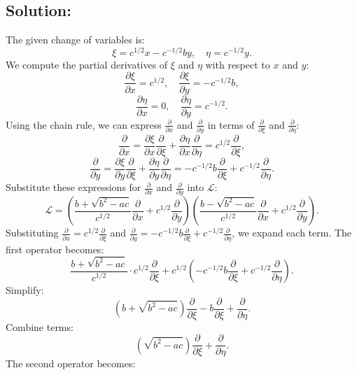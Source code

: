 \documentclass[12pt]{article}
\begin{document}
    \subsection*{Solution:}
        The given change of variables is:
        \[
        \xi = c^{1/2}x - c^{-1/2}by, \quad \eta = c^{-1/2}y.
        \]
        We compute the partial derivatives of \(\xi\) and \(\eta\) with respect to \(x\) and \(y\):
        \[
        \frac{\partial \xi}{\partial x} = c^{1/2}, \quad \frac{\partial \xi}{\partial y} = -c^{-1/2}b,
        \]
        \[
        \frac{\partial \eta}{\partial x} = 0, \quad \frac{\partial \eta}{\partial y} = c^{-1/2}.
        \]
        Using the chain rule, we can express \(\frac{\partial}{\partial x}\) and \(\frac{\partial}{\partial y}\) in terms of \(\frac{\partial}{\partial \xi}\) and \(\frac{\partial}{\partial \eta}\):
        \[
        \frac{\partial}{\partial x} = \frac{\partial \xi}{\partial x} \frac{\partial}{\partial \xi} + \frac{\partial \eta}{\partial x} \frac{\partial}{\partial \eta} = c^{1/2} \frac{\partial}{\partial \xi},
        \]
        \[
        \frac{\partial}{\partial y} = \frac{\partial \xi}{\partial y} \frac{\partial}{\partial \xi} + \frac{\partial \eta}{\partial y} \frac{\partial}{\partial \eta} = -c^{-1/2}b \frac{\partial}{\partial \xi} + c^{-1/2} \frac{\partial}{\partial \eta}.
        \]
        Substitute these expressions for \(\frac{\partial}{\partial x}\) and \(\frac{\partial}{\partial y}\) into \(\mathcal{L}\):
        \[
        \mathcal{L} = \left( \frac{b + \sqrt{b^2 - ac}}{c^{1/2}} \frac{\partial}{\partial x} + c^{1/2} \frac{\partial}{\partial y} \right) \left( \frac{b - \sqrt{b^2 - ac}}{c^{1/2}} \frac{\partial}{\partial x} + c^{1/2} \frac{\partial}{\partial y} \right).
        \]
        Substituting \(\frac{\partial}{\partial x} = c^{1/2} \frac{\partial}{\partial \xi}\) and \(\frac{\partial}{\partial y} = -c^{-1/2}b \frac{\partial}{\partial \xi} + c^{-1/2} \frac{\partial}{\partial \eta}\), we expand each term.
        The first operator becomes:
        \[
        \frac{b + \sqrt{b^2 - ac}}{c^{1/2}} \cdot c^{1/2} \frac{\partial}{\partial \xi} + c^{1/2} \left(-c^{-1/2}b \frac{\partial}{\partial \xi} + c^{-1/2} \frac{\partial}{\partial \eta} \right).
        \]
        Simplify:
        \[
        \left(b + \sqrt{b^2 - ac}\right) \frac{\partial}{\partial \xi} - b \frac{\partial}{\partial \xi} + \frac{\partial}{\partial \eta}.
        \]
        Combine terms:
        \[
        \left(\sqrt{b^2 - ac}\right) \frac{\partial}{\partial \xi} + \frac{\partial}{\partial \eta}.
        \]
        The second operator becomes:
\end{document}
